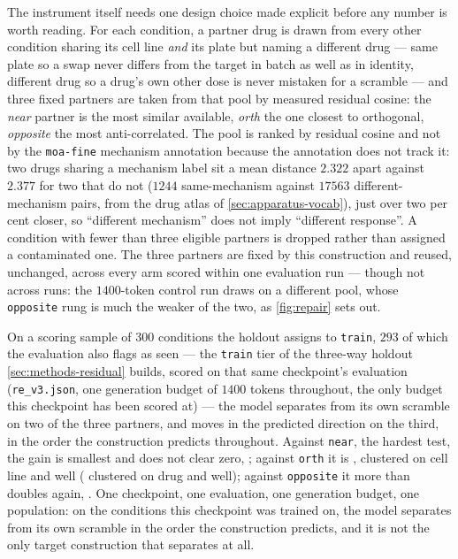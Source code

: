 The instrument itself needs one design choice made explicit before any number is
worth reading. For each condition, a partner drug is drawn from every other
condition sharing its cell line \emph{and} its plate but naming a different drug
--- same plate so a swap never differs from the target in batch as well as in
identity, different drug so a drug's own other dose is never mistaken for a
scramble --- and three fixed partners are taken from that pool by measured
residual cosine: the \emph{near} partner is the most similar available,
\emph{orth} the one closest to orthogonal, \emph{opposite} the most
anti-correlated. The pool is ranked by residual cosine and not by the
\texttt{moa-fine} mechanism annotation because the annotation does not track it:
two drugs sharing a mechanism label sit a mean distance $2.322$ apart against
$2.377$ for two that do not ($\num{1244}$ same-mechanism against $\num{17563}$
different-mechanism pairs, from the drug atlas of \cref{sec:apparatus-vocab}), just over two per cent closer,
so ``different mechanism'' does not imply ``different response''. A condition
with fewer than three eligible partners is dropped rather than assigned a
contaminated one. The three partners are fixed by this construction and reused, unchanged, across
every arm scored within one evaluation run --- though not across runs: the
$1400$-token control run draws on a different pool, whose \texttt{opposite} rung
is much the weaker of the two, as \cref{fig:repair} sets out.

On a scoring sample of $\num{300}$ conditions the holdout assigns to
\texttt{train}, $\num{293}$ of which the evaluation also flags as seen --- the
\texttt{train} tier of the three-way holdout \cref{sec:methods-residual} builds,
scored on that same checkpoint's evaluation (\texttt{re\_v3.json}, one
generation budget of $1400$ tokens throughout, the only budget this checkpoint
has been scored at) --- the model separates from its own scramble on two of the
three partners, and moves in the predicted direction on the third, in the order
the construction predicts throughout. Against \texttt{near}, the hardest test,
the gain is smallest and does not clear zero,
; against \texttt{orth} it is
, clustered on cell line and well
( clustered on drug and well); against
\texttt{opposite} it more than doubles again,
. One checkpoint, one evaluation, one generation budget, one
population: on the conditions this checkpoint was trained on, the model separates
from its own scramble in the order the construction predicts, and it is not the
only target construction that separates at all.

